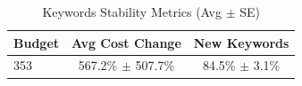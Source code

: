 \begin{table}[htbp]
\centering
\caption{Keywords Stability Metrics (Avg $\pm$ SE)}
\begin{tabular}{lcc}
\toprule
Budget & Avg Cost Change & New Keywords \\
\midrule
353 & 567.2\% $\pm$ 507.7\% & 84.5\% $\pm$ 3.1\% \\
\bottomrule
\end{tabular}
\end{table}
